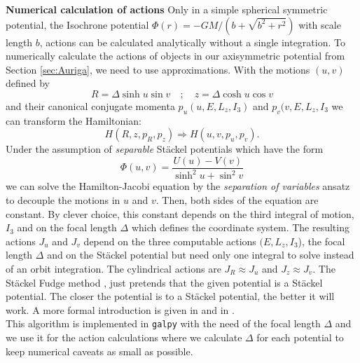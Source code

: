 \textbf{Numerical calculation of actions} Only in a simple spherical symmetric potential, the Isochrone potential $\Phi(r) = -GM/(b + \sqrt{b^2+r^2})$ with scale length $b$, actions can be calculated analytically without a single integration. To numerically calculate the actions of objects in our axisymmetric potential from Section \ref{sec:Auriga}, we need to use approximations. 
With the motions $(u,v)$ defined by 
\begin{equation}
    R = \Delta \sinh{u} \sin{v}\quad ; \quad z = \Delta \cosh{u}\cos{v}
\end{equation}
and their canonical conjugate momenta $p_u(u, E, L_z, I_3)$ and $p_v(v,E,L_z,I_3$ we can transform the Hamiltonian:
\begin{equation}\label{eq:Ham_trafo}
    H(R,z,p_R,p_z) \Rightarrow H(u,v,p_u, p_v).
\end{equation}
Under the assumption of \textit{separable} St\"ackel potentials \citep{deZeeuw...Staeckel..1985} which have the form
\begin{equation}\label{eq:Stackel_pot}
    \Phi(u,v) = \frac{U(u)-V(v)}{\sinh^2u + \sin^2v}
\end{equation}
we can solve the Hamilton-Jacobi equation by the \textit{separation of variables} ansatz to decouple the motions in $u$ and $v$. Then, both sides of the equation are constant. By clever choice, this constant depends on the third integral of motion, $I_3$ and on the focal length $\Delta$ which defines the coordinate system. The resulting actions $J_u$ and $J_v$ depend on the three computable actions $(E, L_z, I_3$), the focal length $\Delta$ and on the St\"ackel potential but need only one integral to solve instead of an orbit integration. The cylindrical actions are $J_R \approx J_u$ and $J_z \approx J_v$. The St\"ackel Fudge method \citep{Binney...StaeckelFudge...2012, Bovy...actionbasedmodelling...2013}, just pretends that the given potential is a St\"ackel potential. The closer the potential is to a St\"ackel potential, the better it will work. A more formal introduction is given in \citet{Binney...Tremaine...2008, Binney...StaeckelFudge...2012, Bovy...actionbasedmodelling...2013} and in \citet{Wilmathesis}. 
\\This algorithm is implemented in \texttt{galpy} with the need of the focal length $\Delta$ and we use it for the action calculations where we calculate $\Delta$ for each potential to keep numerical caveats as small as possible. 

